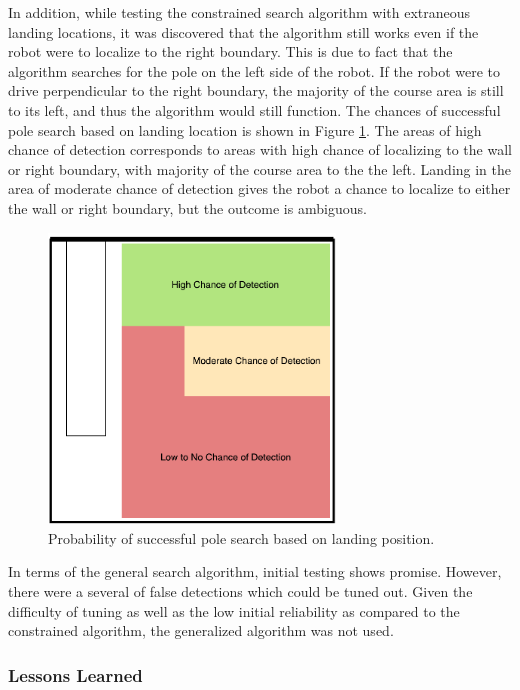 \documentclass[ece]{uw-wkrpt}
\begin{document}
In addition, while testing the constrained search algorithm with extraneous landing locations, it was discovered that the algorithm still works even if the robot were to localize to the right boundary. This is due to fact that the algorithm searches for the pole on the left side of the robot. If the robot were to drive perpendicular to the right boundary, the majority of the course area is still to its left, and thus the algorithm would still function. The chances of successful pole search based on landing location is shown in Figure \ref{fig:SAdetection}. The areas of high chance of detection corresponds to areas with high chance of localizing to the wall or right boundary, with majority of the course area to the the left. Landing in the area of moderate chance of detection gives the robot a chance to localize to either the wall or right boundary, but the outcome is ambiguous.  

\begin{figure}
    \centering
    \includegraphics[width=3in]{res/SA-areaofdetection}
    \caption[Probability of successful pole search based on landing position]
          {Probability of successful pole search based on landing position.}
    \label{fig:SAdetection}
\end{figure}

In terms of the general search algorithm, initial testing shows promise. However, there were a several of false detections which could be tuned out. Given the difficulty of tuning as well as the low initial reliability as compared to the constrained algorithm, the generalized algorithm was not used.

\subsubsection{Lessons Learned}
\end{document}
